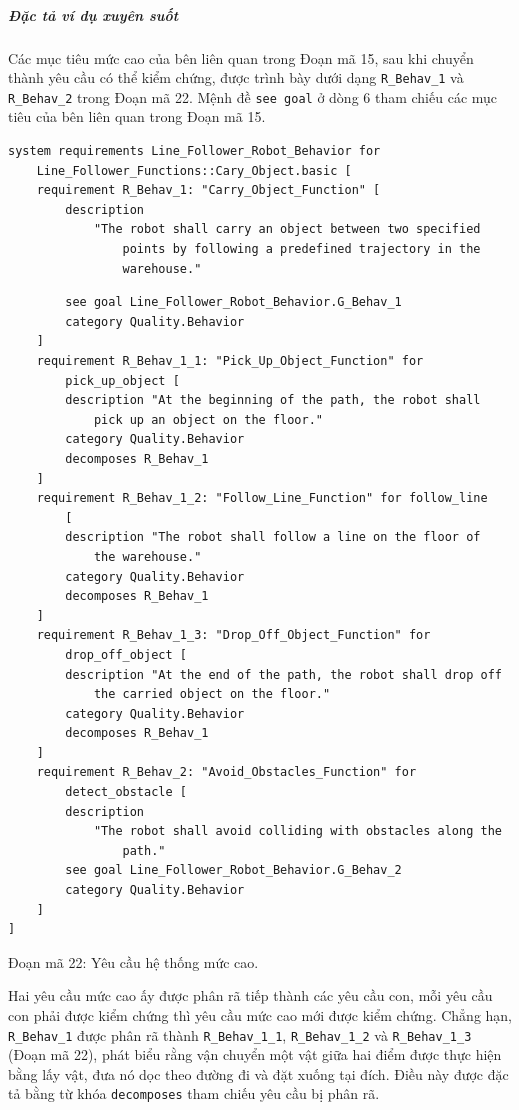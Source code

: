\subparagraph{Đặc tả ví dụ xuyên suốt}
Các mục tiêu mức cao của bên liên quan trong Đoạn mã 15, sau khi chuyển thành yêu cầu có thể kiểm chứng, được trình bày dưới dạng \texttt{R\_Behav\_1} và \texttt{R\_Behav\_2} trong Đoạn mã 22. Mệnh đề \texttt{see goal} ở dòng 6 tham chiếu các mục tiêu của bên liên quan trong Đoạn mã 15.
\begin{verbatim}
system requirements Line_Follower_Robot_Behavior for
    Line_Follower_Functions::Cary_Object.basic [
    requirement R_Behav_1: "Carry_Object_Function" [
        description
            "The robot shall carry an object between two specified
                points by following a predefined trajectory in the
                warehouse."
\end{verbatim}
\begin{verbatim}
        see goal Line_Follower_Robot_Behavior.G_Behav_1
        category Quality.Behavior
    ]
    requirement R_Behav_1_1: "Pick_Up_Object_Function" for
        pick_up_object [
        description "At the beginning of the path, the robot shall
            pick up an object on the floor."
        category Quality.Behavior
        decomposes R_Behav_1
    ]
    requirement R_Behav_1_2: "Follow_Line_Function" for follow_line
        [
        description "The robot shall follow a line on the floor of
            the warehouse."
        category Quality.Behavior
        decomposes R_Behav_1
    ]
    requirement R_Behav_1_3: "Drop_Off_Object_Function" for
        drop_off_object [
        description "At the end of the path, the robot shall drop off
            the carried object on the floor."
        category Quality.Behavior
        decomposes R_Behav_1
    ]
    requirement R_Behav_2: "Avoid_Obstacles_Function" for
        detect_obstacle [
        description
            "The robot shall avoid colliding with obstacles along the
                path."
        see goal Line_Follower_Robot_Behavior.G_Behav_2
        category Quality.Behavior
    ]
]
\end{verbatim}
\begin{center}\small Đoạn mã 22: Yêu cầu hệ thống mức cao.\end{center}

Hai yêu cầu mức cao ấy được phân rã tiếp thành các yêu cầu con, mỗi yêu cầu con phải được kiểm chứng thì yêu cầu mức cao mới được kiểm chứng. Chẳng hạn, \texttt{R\_Behav\_1} được phân rã thành \texttt{R\_Behav\_1\_1}, \texttt{R\_Behav\_1\_2} và \texttt{R\_Behav\_1\_3} (Đoạn mã 22), phát biểu rằng vận chuyển một vật giữa hai điểm được thực hiện bằng lấy vật, đưa nó dọc theo đường đi và đặt xuống tại đích. Điều này được đặc tả bằng từ khóa \texttt{decomposes} tham chiếu yêu cầu bị phân rã.


